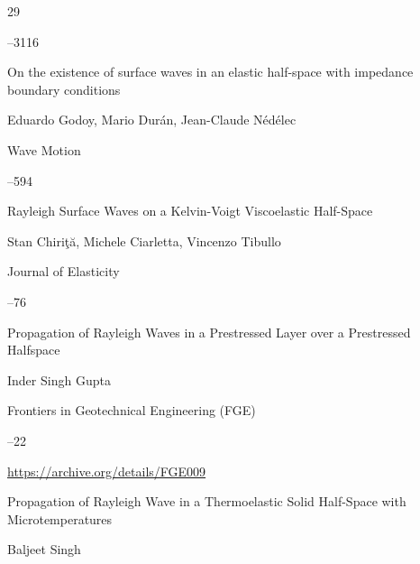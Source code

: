 \begin{thebibliography}{29}


–3116





\paper On the existence of surface waves in an elastic half-space with impedance boundary conditions

\by Eduardo Godoy, Mario Dur\'an, Jean-Claude N\'ed\'elec

\jour Wave Motion




–594





\paper Rayleigh Surface Waves on a Kelvin-Voigt Viscoelastic Half-Space

\by Stan Chiri{\c{t}}{\u{a}},  Michele Ciarletta, Vincenzo Tibullo 

\jour Journal of Elasticity




--76





\paper Propagation of Rayleigh Waves in a Prestressed Layer over a Prestressed Halfspace

\by Inder Singh Gupta 

\jour Frontiers in Geotechnical Engineering (FGE)




--22

\elink \url{https://archive.org/details/FGE009}




\paper Propagation of Rayleigh Wave in a Thermoelastic Solid Half-Space with Microtemperatures

\by Baljeet Singh


\end{thebibliography}
